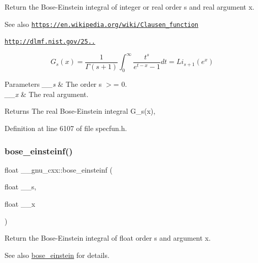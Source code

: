 Return the Bose-\/\+Einstein integral of integer or real order s and real argument x. \begin{DoxySeeAlso}{See also}
\href{https://en.wikipedia.org/wiki/Clausen_function}{\tt https\+://en.\+wikipedia.\+org/wiki/\+Clausen\+\_\+function} 

\href{http://dlmf.nist.gov/25.12.16}{\tt http\+://dlmf.\+nist.\+gov/25..}
\end{DoxySeeAlso}
\[ G_s(x) = \frac{1}{\Gamma(s+1)}\int_0^\infty \frac{t^s}{e^{t-x} - 1}dt = Li_{s+1}(e^x) \]


\begin{DoxyParams}{Parameters}
{\em \+\_\+\+\_\+s} & The order s $>$= 0. \\
\hline
{\em \+\_\+\+\_\+x} & The real argument. \\
\hline
\end{DoxyParams}
\begin{DoxyReturn}{Returns}
The real Bose-\/\+Einstein integral G\+\_\+s(x), 
\end{DoxyReturn}


Definition at line 6107 of file specfun.\+h.

\mbox{\label{group__gnu__math__spec__func_gac1fb313fba5639d4168b6ee682507688}} 
\subsubsection{\texorpdfstring{bose\+\_\+einsteinf()}{bose\_einsteinf()}}
{\footnotesize\ttfamily float \+\_\+\+\_\+gnu\+\_\+cxx\+::bose\+\_\+einsteinf (\begin{DoxyParamCaption}\item[{float}]{\+\_\+\+\_\+s,  }\item[{float}]{\+\_\+\+\_\+x }\end{DoxyParamCaption})\hspace{0.3cm}{\ttfamily [inline]}}

Return the Bose-\/\+Einstein integral of {\ttfamily float} order s and argument x.

\begin{DoxySeeAlso}{See also}
\hyperlink{group__gnu__math__spec__func_gae8135b6861a48f2cee2e692093a17102}{bose\+\_\+einstein} for details. 
\end{DoxySeeAlso}


